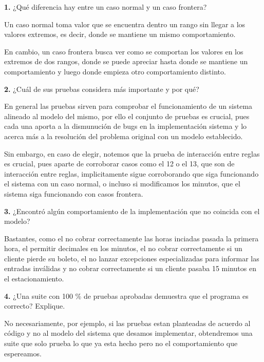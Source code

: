 \documentclass[11pt,letterpaper]{article}
\begin{document}
\textbf{1.} ¿Qué diferencia hay entre un caso normal y un caso frontera?

Un caso normal toma valor que se encuentra dentro un rango sin llegar a los valores extremos, es decir, donde se mantiene un mismo comportamiento.

En cambio, un caso frontera busca ver como se comportan los valores en los extremos de dos rangos, donde se puede apreciar hasta donde se mantiene un comportamiento y luego donde empieza otro comportamiento distinto.

\vspace{\baselineskip}

\textbf{2.} ¿Cuál de sus pruebas considera más importante y por qué?

En general las pruebas sirven para comprobar el funcionamiento de un sistema alineado al modelo del mismo, por ello el conjunto de pruebas es crucial, pues cada una aporta a la dismunución de bugs en la implementación sistema y lo acerca más a la resolución del problema original con un modelo establecido.

\vspace{\baselineskip}

Sin embargo, en caso de elegir, notemos que la prueba de interacción entre reglas es crucial, pues aparte de corroborar casos como el 12 o el 13, que son de interacción entre reglas, implicitamente sigue corroborando que siga funcionando el sistema con un caso normal, o incluso si modificamos los minutos, que el sistema siga funcionando con casos frontera.

\vspace{\baselineskip}

\textbf{3.} ¿Encontró algún comportamiento de la implementación que no coincida con el modelo?

Bastantes, como el no cobrar correctamente las horas inciadas pasada la primera hora, el permitir decimales en los minutos, el no cobrar correctamente si un cliente pierde su boleto, el no lanzar excepciones especializadas para informar las entradas inválidas y no cobrar correctamente si un cliente pasaba 15 minutos en el estacionamiento.

\vspace{\baselineskip}

\textbf{4.} ¿Una suite con 100 \% de pruebas aprobadas demuestra que el programa es correcto? Explique.

No necesariamente, por ejemplo, si las pruebas estan planteadas de acuerdo al código y no al modelo del sistema que desamos implementar, obtendremos una suite que solo prueba lo que ya esta hecho pero no el comportamiento que espereamos.
\end{document}
